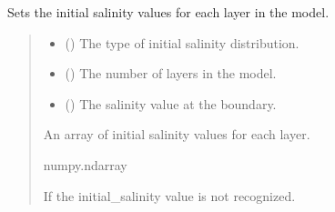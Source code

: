 \documentclass[a4paper,11pt,english,openany]{sphinxmanual}
\begin{document}
\begin{fulllineitems}
\label{\detokenize{api/spyice.preprocess.initial_boundary_conditions:spyice.preprocess.initial_boundary_conditions.set_inital_salinity}}
\pysigstartsignatures
{}
\pysigstopsignatures
\sphinxAtStartPar
Sets the initial salinity values for each layer in the model.
\begin{quote}\begin{description}
\begin{itemize}
\item {} 
\sphinxAtStartPar
{} () \textendash{} The type of initial salinity distribution.

\item {} 
\sphinxAtStartPar
{} () \textendash{} The number of layers in the model.

\item {} 
\sphinxAtStartPar
{} () \textendash{} The salinity value at the boundary.

\end{itemize}

\sphinxAtStartPar
An array of initial salinity values for each layer.

\sphinxAtStartPar
numpy.ndarray

\sphinxAtStartPar
{} \textendash{} If the initial\_salinity value is not recognized.

\end{description}\end{quote}

\end{fulllineitems}

\end{document}
